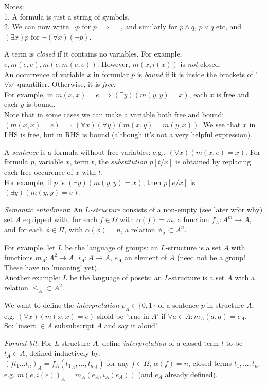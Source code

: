 \documentclass[a4paper]{article}
\begin{document}
Notes:\\
1. A formula is just a string of symbols.\\
2. We can now write $\neg p$ for $p \implies \perp$, and similarly for $p \wedge q$, $p \vee q$ etc, and $(\exists x) p$ for $\neg(\forall x)(\neg p)$.

A term is \emph{closed} if it contains no variables. For example, $e,m(e,e),m(e,m(e,e))$. However, $m(x,i(x))$ is \emph{not} closed.\\
An occurrence of variable $x$ in formular $p$ is \emph{bound} if it is inside the brackets of '$\forall x$' quantifier. Otherwise, it is \emph{free}.\\
For example, in $m(x,x) = e \implies (\exists y) (m(y,y) = x)$, each $x$ is free and each $y$ is bound.\\
Note that in some cases we can make a variable both free and bound: $(m(x,x) = e) \implies (\forall x)(\forall y) (m(x,y) = m(y,x))$. We see that $x$ in LHS is free, but in RHS is bound (although it's not a very helpful expression).

A \emph{sentence} is a formula without free variables: e.g., $(\forall x) (m(x,e) = x)$. For formula $p$, variable $x$, term $t$, the \emph{substitution} $p[t/x]$ is obtained by replacing each free occurence of $x$ with $t$.\\
For example, if $p$ is $(\exists y) (m(y,y) = x)$, then $p[e/x]$ is $(\exists y) (m(y,y) = e)$.

\emph{Semantic entailment}:
An \emph{$L$-structure} consists of a non-empty (see later wfor why) set $A$ equipped with, for each $f \in \Omega$ with $\alpha(f) = m$, a function $f_A:A^m \to A$, and for each $\phi \in \Pi$, with $\alpha(\phi) = n$, a relation $\phi_A \subset A^n$.

For example, let $L$ be the language of groups: an $L$-structure is a set $A$ with functions $m_A:A^2 \to A$, $i_A: A \to A$, $e_A$ an element of $A$ (need not be a group! These have no 'meaning' yet).\\
Another example: $L$ be the language of posets: an $L$-structure is a set $A$ with a relation $\leq_A \subset A^2$.

We want to define the \emph{interpretation} $p_A \in \{0,1\}$ of a sentence $p$ in structure $A$, e.g. $(\forall x)(m(x,x) = e)$ shold be 'true in $A$' if $\forall a \in A: m_A(a,a) = e_A$.\\
So: 'insert $\in A$ subsubscript $A$ and say it aloud'.

\emph{Formal bit}:
For $L$-structure $A$, define \emph{interpretation} of a closed term $t$ to be $t_A \in A$, defined inductively by:\\
$(ft_1...t_n)_A = f_A({t_1}_A,...,{t_n}_A)$ for any $f \in \Omega$, $\alpha(f) = n$, closed terms $t_1,...,t_n$.\\
e.g. $m(e,i(e))_A =m_A (e_A, i_A (e_A))$ (and $e_A$ already defined).\\
\end{document}
